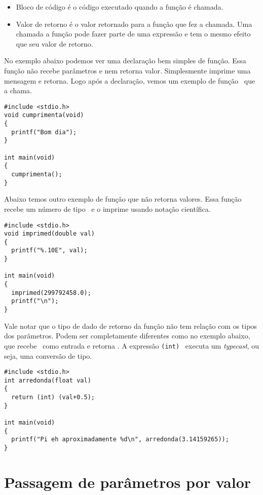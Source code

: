 \begin{itemize}
\item Bloco de código é o código executado quando a função é chamada.

\item Valor de retorno é o valor retornado para a função que fez a chamada. Uma chamada a função pode fazer parte de uma expressão e tem o mesmo efeito que seu valor de retorno.

\end{itemize}

No exemplo abaixo podemos ver uma declaração bem simples de função. Essa função não recebe parâmetros e nem retorna valor. Simplesmente imprime uma mensagem e retorna. Logo após a declaração, vemos um exemplo de função \MAIN\ que a chama.

\begin{lstlisting}
#include <stdio.h>
void cumprimenta(void)
{
  printf("Bom dia");
}

int main(void)
{
  cumprimenta();
}
\end{lstlisting}

Abaixo temos outro exemplo de função que não retorna valores. Essa função recebe um número de tipo \DOUBLE\ e o imprime usando notação científica.

\begin{lstlisting}
#include <stdio.h>
void imprimed(double val)
{
  printf("%.10E", val);
}

int main(void)
{
  imprimed(299792458.0);
  printf("\n");
}
\end{lstlisting}

Vale notar que o tipo de dado de retorno da função não tem relação com os tipos dos parãmetros. Podem ser completamente diferentes como no exemplo abaixo, que recebe \FLOAT\ como entrada e retorna \INT. A expressão {\tt (int) } executa um {\it typecast}, ou seja, uma conversão de tipo. 

\begin{lstlisting}
#include <stdio.h>
int arredonda(float val)
{
  return (int) (val+0.5);
}

int main(void)
{
  printf("Pi eh aproximadamente %d\n", arredonda(3.14159265));
}
\end{lstlisting}


\section{Passagem de parâmetros por valor}

